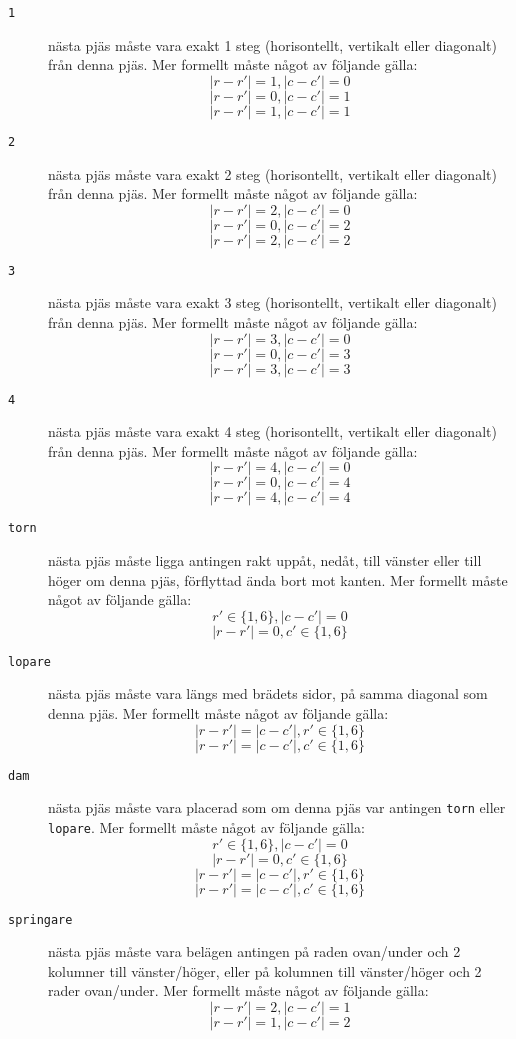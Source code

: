\begin{description}
  \item[\texttt{1}] nästa pjäs måste vara exakt 1 steg (horisontellt, vertikalt eller diagonalt) från denna pjäs.
    Mer formellt måste något av följande gälla:
    $$|r - r'| = 1, |c - c'| = 0$$
    $$|r - r'| = 0, |c - c'| = 1$$
    $$|r - r'| = 1, |c - c'| = 1$$

  \item[\texttt{2}] nästa pjäs måste vara exakt 2 steg (horisontellt, vertikalt eller diagonalt) från denna pjäs.
    Mer formellt måste något av följande gälla:
    $$|r - r'| = 2, |c - c'| = 0$$
    $$|r - r'| = 0, |c - c'| = 2$$
    $$|r - r'| = 2, |c - c'| = 2$$

  \item[\texttt{3}] nästa pjäs måste vara exakt 3 steg (horisontellt, vertikalt eller diagonalt) från denna pjäs.
    Mer formellt måste något av följande gälla:
    $$|r - r'| = 3, |c - c'| = 0$$
    $$|r - r'| = 0, |c - c'| = 3$$
    $$|r - r'| = 3, |c - c'| = 3$$

  \item[\texttt{4}] nästa pjäs måste vara exakt 4 steg (horisontellt, vertikalt eller diagonalt) från denna pjäs.
    Mer formellt måste något av följande gälla:
    $$|r - r'| = 4, |c - c'| = 0$$
    $$|r - r'| = 0, |c - c'| = 4$$
    $$|r - r'| = 4, |c - c'| = 4$$

  \item[\texttt{torn}] nästa pjäs måste ligga antingen rakt
    uppåt, nedåt, till vänster eller till höger om denna pjäs, förflyttad ända bort mot kanten.
    Mer formellt måste något av följande gälla:
    $$r' \in \{1, 6\}, |c - c'| = 0$$
    $$|r - r'| = 0, c' \in \{1, 6\}$$

  \item[\texttt{lopare}] nästa pjäs måste vara längs med brädets sidor, på samma diagonal som denna pjäs.
    Mer formellt måste något av följande gälla:
    $$|r - r'| = |c - c'|, r' \in \{1, 6\}$$
    $$|r - r'| = |c - c'|, c' \in \{1, 6\}$$

  \item[\texttt{dam}] nästa pjäs måste vara placerad som om denna pjäs var antingen \texttt{torn} eller \texttt{lopare}.
    Mer formellt måste något av följande gälla:
    $$r' \in \{1, 6\}, |c - c'| = 0$$
    $$|r - r'| = 0, c' \in \{1, 6\}$$
    $$|r - r'| = |c - c'|, r' \in \{1, 6\}$$
    $$|r - r'| = |c - c'|, c' \in \{1, 6\}$$

  \item[\texttt{springare}] nästa pjäs måste vara belägen antingen på raden ovan/under och 2 kolumner till vänster/höger, eller
    på kolumnen till vänster/höger och 2 rader ovan/under.
    Mer formellt måste något av följande gälla:
    $$|r - r'| = 2, |c - c'| = 1$$
    $$|r - r'| = 1, |c - c'| = 2$$
\end{description}

